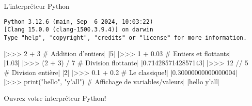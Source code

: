 \documentclass[dvipsnames]{beamer}
\begin{document}
\begin{frame}[fragile]{L'interpréteur Python}

    \begin{verbatim}
Python 3.12.6 (main, Sep  6 2024, 10:03:22)
[Clang 15.0.0 (clang-1500.3.9.4)] on darwin
Type "help", "copyright", "credits" or "license" for more information.
\end{verbatim}

    |>>> 2 + 3                      # Addition d'entiers|\vspace{-1em}
    |5|\vspace{-1em}
    |>>> 1 + 0.03                   # Entiers et flottants|\vspace{-1em}
    |1.03|\vspace{-1em}
    |>>> (2 + 3) / 7                # Division flottante|\vspace{-1em}
    |0.7142857142857143|\vspace{-1em}
    |>>> 12 // 5                    # Division entière|\vspace{-1em}
    |2|\vspace{-1em}
    |>>> 0.1 + 0.2                  # Le classique!|\vspace{-1em}
    |0.30000000000000004|\vspace{-1em}
    |>>> print("hello", "y'all")    # Affichage de variables/valeurs|\vspace{-1em}
    |hello y'all|
\end{frame}

\begin{frame}[standout]
Ouvrez votre interpréteur Python!
\end{frame}
\end{document}
